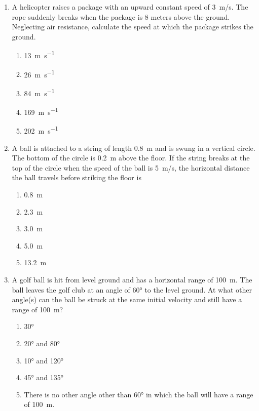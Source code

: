 \documentclass{../../oss-apphys}
\begin{document}
\begin{multicols}{2}
\begin{enumerate}[resume,leftmargin=18pt]
  \item A helicopter raises a package with an upward constant speed of
    \SI{3}{m/s}. The rope suddenly breaks when the package is $8$ meters above
    the ground. Neglecting air resistance, calculate the speed at which the
    package strikes the ground.
    \begin{enumerate}[noitemsep,topsep=0pt,leftmargin=18pt,label=(\Alph*)]
    \item\SI{13 }{\metre\per\second}
    \item\SI{26 }{\metre\per\second}
    \item\SI{84 }{\metre\per\second}
    \item\SI{169}{\metre\per\second}
    \item\SI{202}{\metre\per\second}
    \end{enumerate}
    
  \item A ball is attached to a string of length \SI{.8}{\metre} and is swung
    in a vertical circle. The bottom of the circle is \SI{.2}{\metre} above the
    floor. If the string breaks at the top of the circle when the speed of the
    ball is \SI{5}{m/s}, the horizontal distance the ball travels before
    striking the floor is
    \begin{center}
      \vspace{-.2in}
    \end{center}
    \begin{enumerate}[noitemsep,topsep=0pt,leftmargin=18pt,label=(\Alph*)]
    \item\SI{.8 }{\metre}
    \item\SI{2.3 }{\metre}
    \item\SI{3.0 }{\metre}
    \item\SI{5.0 }{\metre}
    \item\SI{13.2}{\metre}
    \end{enumerate}
    
  \item A golf ball is hit from level ground and has a horizontal range of
    \SI{100}{m}. The ball leaves the golf club at an angle of \ang{60} to the
    level ground. At what other angle(s) can the ball be struck at the same
    initial velocity and still have a range of \SI{100}{m}?
    \begin{center}
      \vspace{-.2in}
    \end{center}
    \begin{enumerate}[noitemsep,topsep=0pt,leftmargin=18pt,label=(\Alph*)]
    \item\ang{30}
    \item\ang{20} and \ang{80}
    \item\ang{10} and \ang{120}
    \item\ang{45} and \ang{135}
    \item There is no other angle other than \ang{60} in which the ball will
      have a range of \SI{100}{m}.
    \end{enumerate}
  \end{enumerate}
  

\end{multicols}
\end{document}
